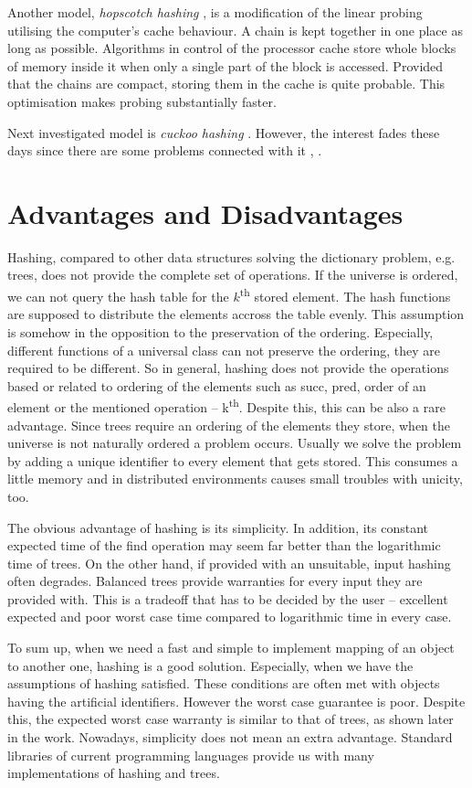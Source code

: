 Another model, \emph{hopscotch hashing} \cite{DBLP:conf/wdag/HerlihyST08}, is a modification of the linear probing utilising the computer's cache behaviour. A chain is kept together in one place as long as possible. Algorithms in control of the processor cache store whole blocks of memory inside it when only a single part of the block is accessed. Provided that the chains are compact, storing them in the cache is quite probable. This optimisation makes probing substantially faster.

Next investigated model is \emph{cuckoo hashing} \cite{782440}. However, the interest fades these days since there are some problems connected with it \cite{DBLP:conf/sofsem/DietzfelbingerS09}, \cite{1496857}.

\section{Advantages and Disadvantages}
Hashing, compared to other data structures solving the dictionary problem, e.g. trees, does not provide the complete set of operations. If the universe is ordered, we can not query the hash table for the $k$\textsuperscript{th} stored element. The hash functions are supposed to distribute the elements accross the table evenly. This assumption is somehow in the opposition to the preservation of the ordering.  Especially, different functions of a universal class can not preserve the ordering, they are required to be different. So in general, hashing does not provide the operations based or related to ordering of the elements such as succ, pred, order of an element or the mentioned operation -- k\textsuperscript{th}. Despite this, this can be also a rare advantage. Since trees require an ordering of the elements they store, when the universe is not naturally ordered a problem occurs. Usually we solve the problem by adding a unique identifier to every element that gets stored. This consumes a little memory and in distributed environments causes small troubles with unicity, too.

The obvious advantage of hashing is its simplicity. In addition, its constant expected time of the find operation may seem far better than the logarithmic time of trees. On the other hand, if provided with an unsuitable, input hashing often degrades. Balanced trees provide warranties for every input they are provided with. This is a tradeoff that has to be decided by the user -- excellent expected and poor worst case time compared to logarithmic time in every case.

To sum up, when we need a fast and simple to implement mapping of an object to another one, hashing is a good solution. Especially, when we have the assumptions of hashing satisfied. These conditions are often met with objects having the artificial identifiers. However the worst case guarantee is poor. Despite this, the expected worst case warranty is similar to that of trees, as shown later in the work. Nowadays, simplicity does not mean an extra advantage. Standard libraries of current programming languages provide us with many implementations of hashing and trees.

